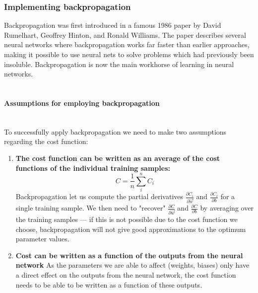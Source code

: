 \documentclass[10pt, a4paper, twocolumn]{article}
\newcommand{\myparagraph}[1]{\paragraph{#1}\mbox{}\\}
\begin{document}
		\subsubsection{Implementing backpropagation}
			Backpropagation was first introduced in a famous 1986 paper by David Rumelhart, Geoffrey Hinton, and Ronald Williams. The paper describes several neural networks where backpropagation works far faster than earlier approaches, making it possible to use neural nets to solve problems which had previously been insoluble. Backpropagation is now the main workhorse of learning in neural networks.\\\\
			
			\myparagraph{Assumptions for employing backpropagation}
			To successfully apply backpropagation we need to make two assumptions regarding the cost function:
			\begin{enumerate}
				\item \textbf{The cost function can be written as an average of the cost functions of the individual training samples:} 
				$$C = \frac{1}{n}\sum_i^n C_i$$
				Backpropagation let us compute the partial derivatives $\frac{\partial C_i}{\partial \vec{w}}$ and $\frac{\partial C_i}{\partial b}$ for a single training sample. We then need to "recover" $\frac{\partial C}{\partial \vec{w}}$ and $\frac{\partial C}{\partial b}$ by averaging over the training samples --- if this is not possible due to the cost function we choose, backpropagation will not give good approximations to the optimum parameter values.
				\item \textbf{Cost can be written as a function of the outputs from the neural network}
					As the parameters we are able to affect (weights, biases) only have a direct effect on the outputs from the neural network, the cost function needs to be able to be written as a function of these outputs.
			\end{enumerate}	
			
\end{document}
